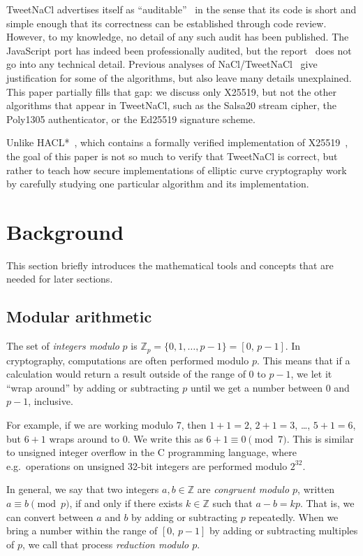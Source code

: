 \documentclass[manuscript]{acmart}
\begin{document}
TweetNaCl advertises itself as ``auditable''~\cite{Bernstein:2014ca} in the sense that its code is short and simple enough that its correctness can be established through code review.
However, to my knowledge, no detail of any such audit has been published.
The JavaScript port has indeed been professionally audited, but the report~\cite{TweetNaClAudit} does not go into any technical detail.
Previous analyses of NaCl/TweetNaCl~\cite{Bernstein:2009,Janssen:2014} give justification for some of the algorithms, but also leave many details unexplained.
This paper partially fills that gap: we discuss only X25519, but not the other algorithms that appear in TweetNaCl, such as the Salsa20 stream cipher, the Poly1305 authenticator, or the Ed25519 signature scheme.

Unlike HACL*~\cite{HACLStar}, which contains a formally verified implementation of X25519~\cite{Zinzindohoue:2017fc}, the goal of this paper is not so much to verify that TweetNaCl is correct, but rather to teach how secure implementations of elliptic curve cryptography work by carefully studying one particular algorithm and its implementation.

\section{Background}\label{sec:background}

This section briefly introduces the mathematical tools and concepts that are needed for later sections.

\subsection{Modular arithmetic}\label{sec:modular-arithmetic}

The set of \emph{integers modulo} $p$ is $\mathbb{Z}_p = \{0, 1, \dots, p-1\} = [0,\, p-1]$.
In cryptography, computations are often performed modulo $p$.
This means that if a calculation would return a result outside of the range of 0 to $p-1$, we let it ``wrap around'' by adding or subtracting $p$ until we get a number between 0 and $p-1$, inclusive.

For example, if we are working modulo 7, then $1+1=2$, $2+1=3$, \dots, $5+1=6$, but $6+1$ wraps around to $0$.
We write this as $6+1 \equiv 0 \pmod{7}$.
This is similar to unsigned integer overflow in the C programming language, where e.g.\ operations on unsigned 32-bit integers are performed modulo $2^{32}$.

In general, we say that two integers $a, b \in \mathbb{Z}$ are \emph{congruent modulo $p$}, written $a \equiv b \pmod{p}$, if and only if there exists $k \in \mathbb{Z}$ such that $a - b = kp$.
That is, we can convert between $a$ and $b$ by adding or subtracting $p$ repeatedly.
When we bring a number within the range of $[0,\, p-1]$ by adding or subtracting multiples of $p$, we call that process \emph{reduction modulo $p$}.
\end{document}
